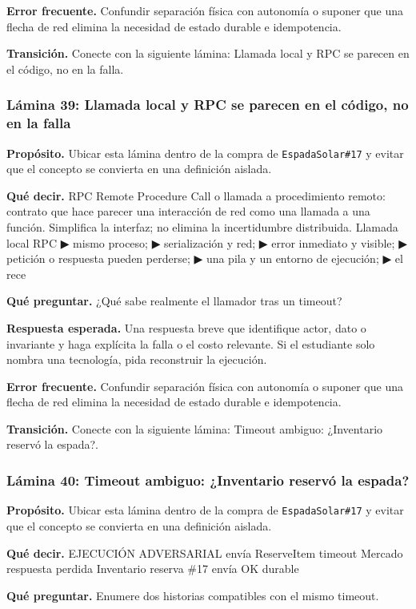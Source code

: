 \documentclass[variant=docente,cover=institutional,mode=screen]{ua-engineering-v6-article}
\begin{document}
\textbf{Error frecuente.} Confundir separación física con autonomía o suponer que una flecha de red elimina la necesidad de estado durable e idempotencia.

\textbf{Transición.} Conecte con la siguiente lámina: Llamada local y RPC se parecen en el código, no en la falla.

\subsubsection*{Lámina 39: Llamada local y RPC se parecen en el código, no en la falla}
\textbf{Propósito.} Ubicar esta lámina dentro de la compra de \texttt{EspadaSolar\#17} y evitar que el concepto se convierta en una definición aislada.

\textbf{Qué decir.} RPC Remote Procedure Call o llamada a procedimiento remoto: contrato que hace parecer una interacción de red como una llamada a una función. Simplifica la interfaz; no elimina la incertidumbre distribuida. Llamada local RPC ▶ mismo proceso; ▶ serialización y red; ▶ error inmediato y visible; ▶ petición o respuesta pueden perderse; ▶ una pila y un entorno de ejecución; ▶ el rece

\textbf{Qué preguntar.} ¿Qué sabe realmente el llamador tras un timeout?

\textbf{Respuesta esperada.} Una respuesta breve que identifique actor, dato o invariante y haga explícita la falla o el costo relevante. Si el estudiante solo nombra una tecnología, pida reconstruir la ejecución.

\textbf{Error frecuente.} Confundir separación física con autonomía o suponer que una flecha de red elimina la necesidad de estado durable e idempotencia.

\textbf{Transición.} Conecte con la siguiente lámina: Timeout ambiguo: ¿Inventario reservó la espada?.

\subsubsection*{Lámina 40: Timeout ambiguo: ¿Inventario reservó la espada?}
\textbf{Propósito.} Ubicar esta lámina dentro de la compra de \texttt{EspadaSolar\#17} y evitar que el concepto se convierta en una definición aislada.

\textbf{Qué decir.} EJECUCIÓN ADVERSARIAL envía ReserveItem timeout Mercado respuesta perdida Inventario reserva \#17 envía OK durable

\textbf{Qué preguntar.} Enumere dos historias compatibles con el mismo timeout.
\end{document}
